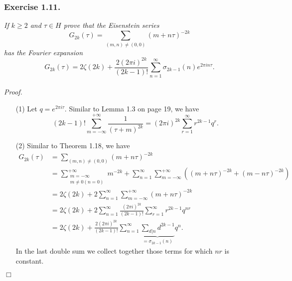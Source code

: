 \documentclass{article}
\begin{document}



\subsubsection*{Exercise 1.11.}
\emph{If $k \geq 2$ and $\tau \in H$ prove that the Eisenstein series
\[
  G_{2k}(\tau)
  = \sum_{(m,n) \neq (0,0)} (m+n\tau)^{-2k}
\]
has the Fourier expansion
}
\[
  G_{2k}(\tau)
  =
  2 \zeta(2k) + \frac{2(2\pi i)^{2k}}{(2k-1)!} \sum_{n=1}^{\infty} \sigma_{2k-1}(n) e^{2\pi i n \tau}.
\] \\



\emph{Proof.}
\begin{enumerate}
\item[(1)]
  Let $q = e^{2 \pi i \tau}$.
  Similar to Lemma 1.3 on page 19, we have
  \[
    (2k-1)! \sum_{m=-\infty}^{+\infty} \frac{1}{(\tau+m)^{2k}}
    = (2 \pi i)^{2k} \sum_{r=1}^{\infty} r^{2k-1} q^r.
  \]

\item[(2)]
  Similar to Theorem 1.18, we have
  \begin{align*}
    G_{2k}(\tau)
    &= \sum_{(m,n) \neq (0,0)} (m+n\tau)^{-2k} \\
    &= \sum_{\substack{m=-\infty \\ m \neq 0 (n = 0)}}^{+\infty} m^{-2k}
      + \sum_{n=1}^{\infty} \sum_{m=-\infty}^{+\infty} ((m+n\tau)^{-2k} + (m-n\tau)^{-2k}) \\
    &= 2 \zeta(2k)
      + 2 \sum_{n=1}^{\infty} \sum_{m=-\infty}^{+\infty} (m+n\tau)^{-2k} \\
    &= 2 \zeta(2k)
      + 2 \sum_{n=1}^{\infty} \frac{(2\pi i)^{2k}}{(2k-1)!}
        \sum_{r=1}^{\infty} r^{2k-1} q^{nr} \\
    &= 2 \zeta(2k)
      + \frac{2(2\pi i)^{2k}}{(2k-1)!} \sum_{n=1}^{\infty}
        \underbrace{\sum_{d|n} d^{2k-1}}_{= \sigma_{2k-1}(n)} q^{n}.
  \end{align*}
  In the last double sum we collect together those terms for which $nr$ is constant.
\end{enumerate}
$\Box$ \\\\



\end{document}

